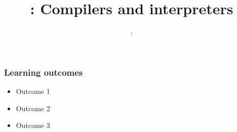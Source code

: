 \usepackage{../../beamerthemeFalmouthGamesAcademy}
\usepackage{multimedia}
\graphicspath{ {../../} }


\usepackage[normalem]{ulem}
\usepackage{wasysym}

\usepackage{pdfpages}

\usetikzlibrary{arrows,automata}




\title{\sessionnumber: Compilers and interpreters}
\subtitle{\modulecode: \moduletitle}

\frame{\titlepage} 

\begin{frame}
	\frametitle{Learning outcomes}
	\begin{itemize}
		\item Outcome 1
		\item Outcome 2
		\item Outcome 3
	\end{itemize}
\end{frame}




